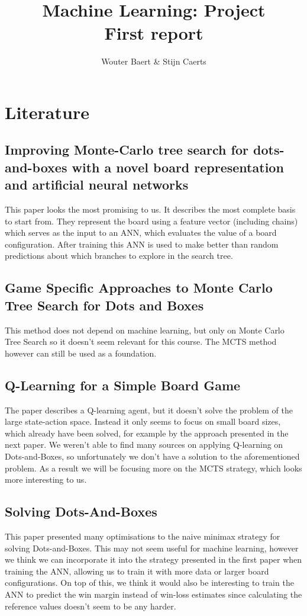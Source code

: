 \documentclass[11pt,a4paper]{article}
\author{Wouter Baert \& Stijn Caerts}
\title{Machine Learning: Project \\ \small{First report}}
\begin{document}
	\maketitle
	\section{Literature}
	\subsection{Improving Monte-Carlo tree search for dots-and-boxes with a novel board representation and artificial neural networks \cite{7317912}}
	This paper looks the most promising to us. It describes the most complete basis to start from. They represent the board using a feature vector (including chains) which serves as the input to an ANN, which evaluates the value of a board configuration. After training this ANN is used to make better than random predictions about which branches to explore in the search tree.
	
	\subsection{Game Specific Approaches to Monte Carlo Tree Search for Dots and Boxes}
	This method does not depend on machine learning, but only on Monte Carlo Tree Search so it doesn't seem relevant for this course. The MCTS method however can still be used as a foundation.
	
	\subsection{Q-Learning for a Simple Board Game}
	The paper describes a Q-learning agent, but it doesn't solve the problem of the large state-action space. Instead it only seems to focus on small board sizes, which already have been solved, for example by the approach presented in the next paper. We weren't able to find many sources on applying Q-learning on Dots-and-Boxes, so unfortunately we don't have a solution to the aforementioned problem. As a result we will be focusing more on the MCTS strategy, which looks more interesting to us.
	
	\subsection{Solving Dots-And-Boxes}
	This paper presented many optimisations to the naive minimax strategy for solving Dots-and-Boxes. This may not seem useful for machine learning, however we think we can incorporate it into the strategy presented in the first paper when training the ANN, allowing us to train it with more data or larger board configurations. On top of this, we think it would also be interesting to train the ANN to predict the win margin instead of win-loss estimates since calculating the reference values doesn't seem to be any harder.
	
\end{document}

